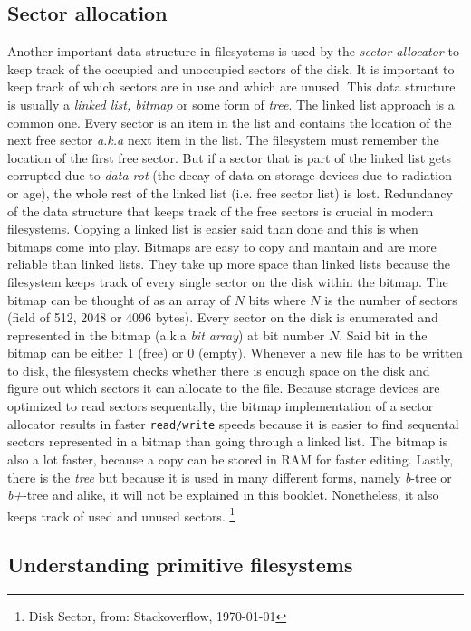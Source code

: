 \subsection{Sector allocation}

Another important data structure in filesystems is used by the \textit{sector allocator} to keep track of the
occupied and unoccupied sectors of the disk. It is important to keep track of which sectors are in use and
which are unused. This data structure is usually a \textit{linked list, bitmap} or some form of \textit{tree}. The
linked list approach is a common one. Every sector is an item in the list and contains the location of
the next free sector \textit{a.k.a} next item in the list. The filesystem must remember the
location of the first free sector. But if a sector that is part of the linked list gets corrupted due
to \textit{data rot} (the decay of data on storage devices due to radiation or age), the whole rest of the
linked list (i.e. free sector list) is lost. Redundancy of the data structure that keeps track of the free sectors is
crucial in modern filesystems. Copying a linked list is easier said than done and this is when bitmaps
come into play. Bitmaps are easy to copy and mantain and are more reliable than linked lists. They
take up more space than linked lists because the filesystem keeps track of every single sector on the
disk within the bitmap. The bitmap can be thought of as an array of $N$ bits where $N$ is the
number of sectors (field of 512, 2048 or 4096 bytes). Every sector on the disk is enumerated and 
represented in the bitmap (a.k.a \textit{bit array}) at bit number $N$. Said bit in the bitmap can be
either 1 (free) or 0 (empty). Whenever a new file has to be written to disk, the filesystem checks
whether there is enough space on the disk and figure out which sectors it can allocate to the file.
Because storage devices are optimized to read sectors sequentally, the bitmap implementation of a
sector allocator results in faster \texttt{read/write} speeds because it is easier to find sequental sectors
represented in a bitmap than going through a linked list. The bitmap is also a lot faster, because a
copy can be stored in RAM for faster editing. Lastly, there is the \textit{tree} but because it is used in
many different forms, namely \textit{b}-tree or \textit{b+}-tree and alike, it will not be explained in this booklet.
Nonetheless, it also keeps track of used and unused sectors. \footnote{Disk Sector, from: Stackoverflow, \today }


\subsection{Understanding primitive filesystems}

